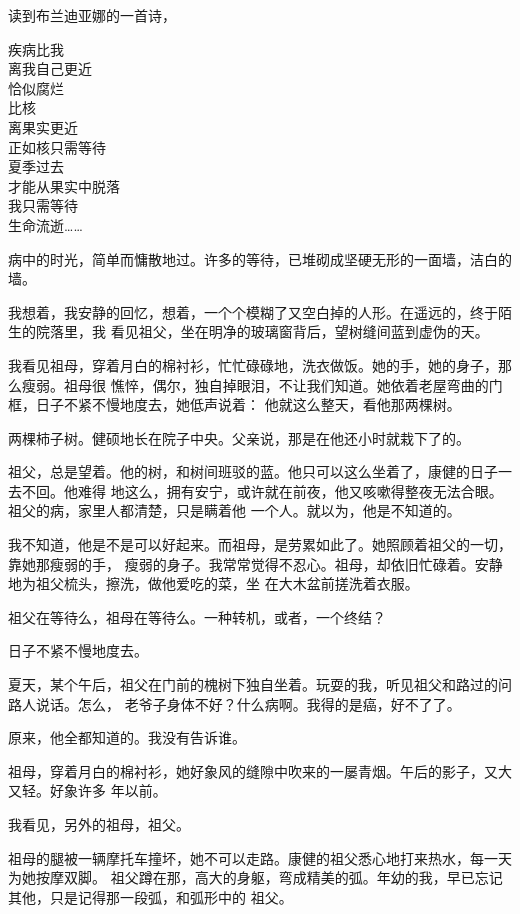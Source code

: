 		读到布兰迪亚娜的一首诗，

		\longpoem{}{}{}
			疾病比我 \\
			离我自己更近 \\
			恰似腐烂 \\
			比核 \\
			离果实更近 \\
			正如核只需等待 \\
			夏季过去 \\
			才能从果实中脱落 \\
			我只需等待 \\
			生命流逝……
		\endlongpoem

		病中的时光，简单而慵散地过。许多的等待，已堆砌成坚硬无形的一面墙，洁白的墙。

		我想着，我安静的回忆，想着，一个个模糊了又空白掉的人形。在遥远的，终于陌生的院落里，我
	看见祖父，坐在明净的玻璃窗背后，望树缝间蓝到虚伪的天。

		我看见祖母，穿着月白的棉衬衫，忙忙碌碌地，洗衣做饭。她的手，她的身子，那么瘦弱。祖母很
	憔悴，偶尔，独自掉眼泪，不让我们知道。她依着老屋弯曲的门框，日子不紧不慢地度去，她低声说着：
	他就这么整天，看他那两棵树。

		两棵柿子树。健硕地长在院子中央。父亲说，那是在他还小时就栽下了的。

		祖父，总是望着。他的树，和树间班驳的蓝。他只可以这么坐着了，康健的日子一去不回。他难得
	地这么，拥有安宁，或许就在前夜，他又咳嗽得整夜无法合眼。祖父的病，家里人都清楚，只是瞒着他
	一个人。就以为，他是不知道的。

		我不知道，他是不是可以好起来。而祖母，是劳累如此了。她照顾着祖父的一切，靠她那瘦弱的手，
	瘦弱的身子。我常常觉得不忍心。祖母，却依旧忙碌着。安静地为祖父梳头，擦洗，做他爱吃的菜，坐
	在大木盆前搓洗着衣服。

		祖父在等待么，祖母在等待么。一种转机，或者，一个终结？

		日子不紧不慢地度去。

		夏天，某个午后，祖父在门前的槐树下独自坐着。玩耍的我，听见祖父和路过的问路人说话。怎么，
	老爷子身体不好？什么病啊。我得的是癌，好不了了。

		原来，他全都知道的。我没有告诉谁。

		祖母，穿着月白的棉衬衫，她好象风的缝隙中吹来的一屡青烟。午后的影子，又大又轻。好象许多
	年以前。

		我看见，另外的祖母，祖父。

		祖母的腿被一辆摩托车撞坏，她不可以走路。康健的祖父悉心地打来热水，每一天为她按摩双脚。
	祖父蹲在那，高大的身躯，弯成精美的弧。年幼的我，早已忘记其他，只是记得那一段弧，和弧形中的
	祖父。

